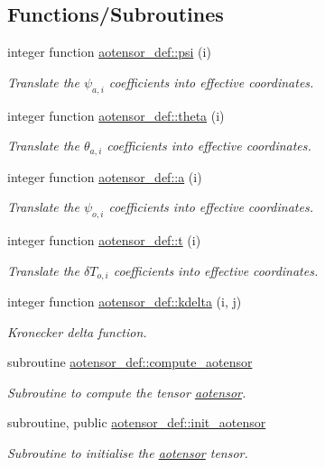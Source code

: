 \subsection*{Functions/\+Subroutines}
\begin{DoxyCompactItemize}
\item 
integer function \hyperlink{namespaceaotensor__def_afa05aa849a8cb9e08b36dee6560986b8}{aotensor\+\_\+def\+::psi} (i)
\begin{DoxyCompactList}\small\item\em Translate the $\psi_{a,i}$ coefficients into effective coordinates. \end{DoxyCompactList}\item 
integer function \hyperlink{namespaceaotensor__def_a506f7d7bc9671005e5ed9a403bb29394}{aotensor\+\_\+def\+::theta} (i)
\begin{DoxyCompactList}\small\item\em Translate the $\theta_{a,i}$ coefficients into effective coordinates. \end{DoxyCompactList}\item 
integer function \hyperlink{namespaceaotensor__def_abdb4d710d4614fef61179c46d8e26b8e}{aotensor\+\_\+def\+::a} (i)
\begin{DoxyCompactList}\small\item\em Translate the $\psi_{o,i}$ coefficients into effective coordinates. \end{DoxyCompactList}\item 
integer function \hyperlink{namespaceaotensor__def_aed72341f9a3de19b5e8c21fd27471ce6}{aotensor\+\_\+def\+::t} (i)
\begin{DoxyCompactList}\small\item\em Translate the $\delta T_{o,i}$ coefficients into effective coordinates. \end{DoxyCompactList}\item 
integer function \hyperlink{namespaceaotensor__def_a13eb91ac3a121fd77c1cf644021cff5b}{aotensor\+\_\+def\+::kdelta} (i, j)
\begin{DoxyCompactList}\small\item\em Kronecker delta function. \end{DoxyCompactList}\item 
subroutine \hyperlink{namespaceaotensor__def_af8d3b24f71f7b03dd5335e20a00c73b4}{aotensor\+\_\+def\+::compute\+\_\+aotensor}
\begin{DoxyCompactList}\small\item\em Subroutine to compute the tensor \hyperlink{namespaceaotensor__def_a0dc43bc9294a18f2fe57b67489f1702f}{aotensor}. \end{DoxyCompactList}\item 
subroutine, public \hyperlink{namespaceaotensor__def_ac583b298e9b68f84b0a22588d3b7dbcd}{aotensor\+\_\+def\+::init\+\_\+aotensor}
\begin{DoxyCompactList}\small\item\em Subroutine to initialise the \hyperlink{namespaceaotensor__def_a0dc43bc9294a18f2fe57b67489f1702f}{aotensor} tensor. \end{DoxyCompactList}\end{DoxyCompactItemize}
